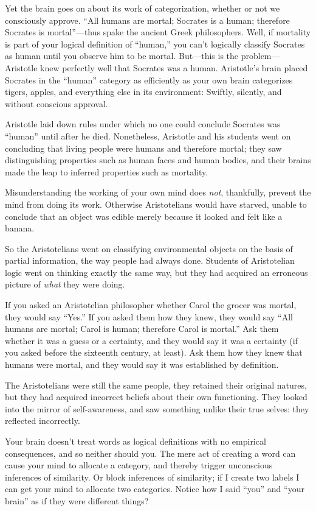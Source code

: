 {{{
 Yet the brain goes on about its work of categorization, whether or
not we consciously approve. ``All humans are mortal;
Socrates is a human; therefore Socrates is
mortal''---thus spake the ancient Greek philosophers.
Well, if mortality is part of your logical definition of
``human,'' you can't
logically classify Socrates as human until you observe him to be
mortal. But---this is the problem---Aristotle knew perfectly well that
Socrates was a human. Aristotle's brain placed Socrates
in the ``human'' category as
efficiently as your own brain categorizes tigers, apples, and
everything else in its environment: Swiftly, silently, and without
conscious approval.}

{
 Aristotle laid down rules under which no one could conclude
Socrates was ``human'' until after
he died. Nonetheless, Aristotle and his students went on concluding
that living people were humans and therefore mortal; they saw
distinguishing properties such as human faces and human bodies, and
their brains made the leap to inferred properties such as mortality.}

{
 Misunderstanding the working of your own mind does \textit{not},
thankfully, prevent the mind from doing its work. Otherwise
Aristotelians would have starved, unable to conclude that an object was
edible merely because it looked and felt like a banana.}

{
 So the Aristotelians went on classifying environmental objects on
the basis of partial information, the way people had always done.
Students of Aristotelian logic went on thinking exactly the same way,
but they had acquired an erroneous picture of \textit{what} they were
doing.}

{
 If you asked an Aristotelian philosopher whether Carol the grocer
was mortal, they would say ``Yes.''
If you asked them how they knew, they would say ``All
humans are mortal; Carol is human; therefore Carol is
mortal.'' Ask them whether it was a guess or a
certainty, and they would say it was a certainty (if you asked before
the sixteenth century, at least). Ask them how they knew that humans
were mortal, and they would say it was established by definition.}

{
 The Aristotelians were still the same people, they retained their
original natures, but they had acquired incorrect beliefs about their
own functioning. They looked into the mirror of self-awareness, and saw
something unlike their true selves: they reflected incorrectly.}

{
 Your brain doesn't treat words as logical
definitions with no empirical consequences, and so neither should you.
The mere act of creating a word can cause your mind to allocate a
category, and thereby trigger unconscious inferences of similarity. Or
block inferences of similarity; if I create two labels I can get your
mind to allocate two categories. Notice how I said
``you'' and ``your
brain'' as if they were different things?}

}}
